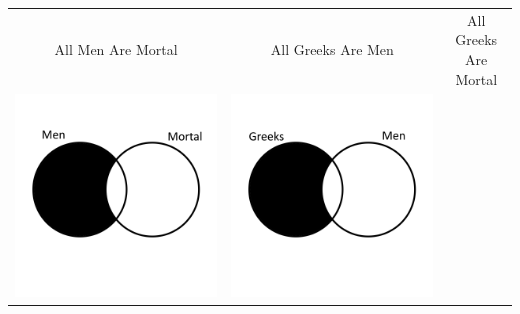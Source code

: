 \documentclass[12pt,a4paper]{report}
\begin{document}
\begin{table}[htb]
  \centering
  \begin{tabular}{ c  c  c }
    All Men Are Mortal & All Greeks Are Men & All Greeks Are Mortal\\
    \begin{minipage}{.29\textwidth}
      \includegraphics[scale=0.25]{VennAllMenAreMortal}
    \end{minipage}
    &
    \begin{minipage}{.29\textwidth}
      \includegraphics[scale=0.25]{VennAllGreeksAreMen}

\end{minipage}
\end{tabular}
\end{table}
\end{document}
